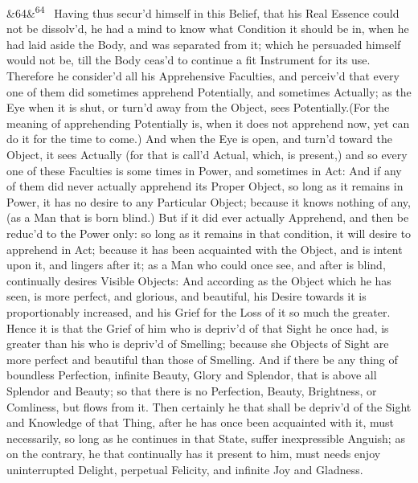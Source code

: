 \documentclass[12pt]{article}
\newcommand{\para}[1][]{\par\noindent\ifx&#1&\else\textsuperscript{\footnotesize #1}~\fi}
\begin{document}
\para[64] Having thus secur'd himself in this Belief, that his Real Essence could not be dissolv'd, he had a mind to know what Condition it should be in, when he had laid aside the Body, and was separated from it; which he persuaded himself would not be, till the Body ceas'd to continue a fit Instrument for its use. Therefore he consider'd all his Apprehensive Faculties, and perceiv'd that every one of them did sometimes apprehend Potentially, and sometimes Actually; as the Eye when it is shut, or turn'd away from the Object, sees Potentially.(For the meaning of apprehending Potentially is, when it does not apprehend now, yet can do it for the time to come.) And when the Eye is open, and turn'd toward the Object, it sees Actually (for that is call'd Actual, which, is present,) and so every one of these Faculties is some times in Power, and sometimes in Act: And if any of them did never actually apprehend its Proper Object, so long as it remains in Power, it has no desire to any Particular Object; because it knows nothing of any, (as a Man that is born blind.) But if it did ever actually Apprehend, and then be reduc'd to the Power only: so long as it remains in that condition, it will desire to apprehend in Act; because it has been acquainted with the Object, and is intent upon it, and lingers after it; as a Man who could once see, and after is blind, continually desires Visible Objects: And according as the Object which he has seen, is more perfect, and glorious, and beautiful, his Desire towards it is proportionably increased, and his Grief for the Loss of it so much the greater. Hence it is that the Grief of him who is depriv'd of that Sight he once had, is greater than his who is depriv'd of Smelling; because she Objects of Sight are more perfect and beautiful than those of Smelling. And if there be any thing of boundless Perfection, infinite Beauty, Glory and Splendor, that is above all Splendor and Beauty; so that there is no Perfection, Beauty, Brightness, or Comliness, but flows from it. Then certainly he that shall be depriv'd of the Sight and Knowledge of that Thing, after he has once been acquainted with it, must necessarily, so long as he continues in that State, suffer inexpressible Anguish; as on the contrary, he that continually has it present to him, must needs enjoy uninterrupted Delight, perpetual Felicity, and infinite Joy and Gladness.
\end{document}
